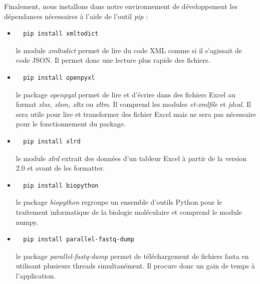 \documentclass[twoside,a4paper,11pt,frenchb,openany]{report}
\begin{document}
Finalement, nous installons dans notre environnement de développement les dépendances nécessaires à l'aide de l'outil \textit{pip} :
\begin{itemize}
\item \begin{verbatim}  pip install xmltodict\end{verbatim}
le module \textit{xmltodict} permet de lire du code XML comme si il s'agissait de code JSON. Il permet donc une lecture plus rapide des fichiers.
\item  \begin{verbatim}  pip install openpyxl\end{verbatim}
le package \textit{openpyxl} permet de lire et d'écrire dans des fichiers Excel au format \textit{xlsx, xlsm, xltx} ou \textit{xltm}. Il comprend les modules \textit{et-xmlfile} et \textit{jdcal}. Il sera utile pour lire et transformer des fichier Excel mais ne sera pas nécessaire pour le fonctionnement du package.
\item  \begin{verbatim}  pip install xlrd\end{verbatim}
le module \textit{xlrd} extrait des données d'un tableur Excel à partir de la version 2.0 et avant de les formatter.
\item  \begin{verbatim}  pip install biopython\end{verbatim}
le package \textit{biopython} regroupe un ensemble d'outils Python pour le traitement informatique de la biologie moléculaire et comprend le module numpy.
\item \begin{verbatim}  pip install parallel-fastq-dump\end{verbatim}
le package \textit{parallel-fastq-dump} permet de téléchargement de fichiers fasta en utilisant plusieurs threads simultanément. Il procure donc un gain de temps à l'application. 
\end{itemize}
\end{document}
